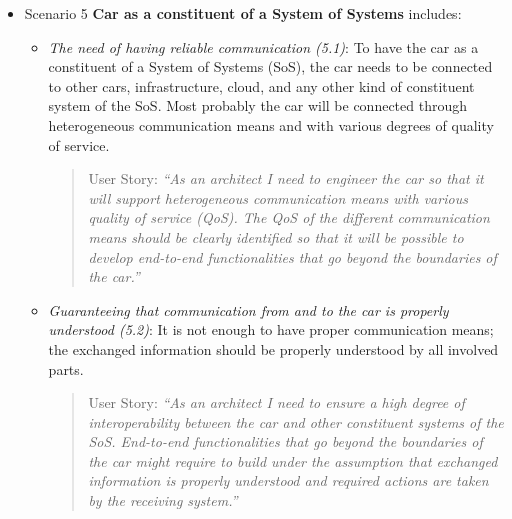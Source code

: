 \begin{itemize}
\begin{itemize}
\item {\em The need for establishing short feedback cycles (4.3)}: While developing new functionality, basic software, and hardware, one should plan on how to receive feedback, which data to collect, and how to use it in the development.

\begin{quote}
{User Story:} 
\emph{``As any developer of the electrical system (internal or external) I want to have quick feedback on how my contribution will work on the various levels of integration. 
As a Functional Developer, I want to have fast and defined feedback cycles. 
As a tester, I want quick updates on all levels of tests and continuous improvement of functionality.''}
\end{quote}
\end{itemize}



\item Scenario 5 {\bf Car as a constituent of a System of Systems} includes:

\begin{itemize}
\item {\em The need of having reliable communication (5.1)}: To have the car as a constituent of a System of Systems (SoS), the car needs to be connected to other cars, infrastructure, cloud, and any other kind of constituent system of the SoS. Most probably the car will be connected through heterogeneous communication means and with various degrees of quality of service.

\begin{quote}
{User Story:} 
\emph{``As an architect I need to engineer the car so that it will support heterogeneous communication means with various quality of service (QoS). The QoS of the different communication means should be clearly identified so that it will be possible to develop end-to-end functionalities that go beyond the boundaries of the car.''}
\end{quote}

\item {\em Guaranteeing that communication from and to the car is properly understood (5.2)}: It is not enough to have proper communication means; the exchanged information should be properly understood by all involved parts.

\begin{quote}
{User Story:} 
\emph{``As an architect I need to ensure a high degree of interoperability between the car and other constituent systems of the SoS. End-to-end functionalities that go beyond the boundaries of the car might require to build under the assumption that exchanged information is properly understood and required actions are taken by the receiving system.''}
\end{quote}


\end{itemize}
\end{itemize}
